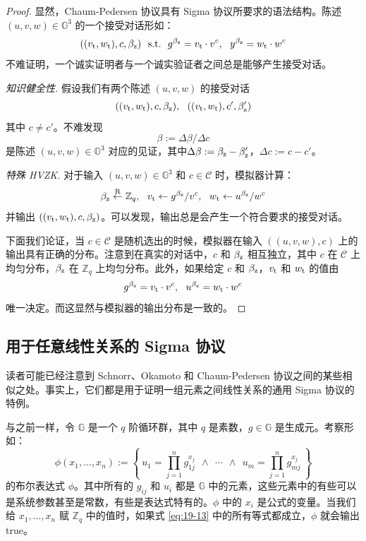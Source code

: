 \begin{proof}
显然，Chaum-Pedersen 协议具有 Sigma 协议所要求的语法结构。陈述 $(u,v,w)\in\mathbb{G}^3$ 的一个接受对话形如：
$$
((v_{\rm t},w_{\rm t}),c,\beta_{\rm z}) \text{~~s.t.~~} 
g^{\beta_{\rm z}}=v_{\rm t}\cdot v^c,~~
y^{\beta_{\rm z}}=w_{\rm t}\cdot w^c
$$
不难证明，一个诚实证明者与一个诚实验证者之间总是能够产生接受对话。

\noindent
\emph{知识健全性.}
假设我们有两个陈述 $(u,v,w)$ 的接受对话
$$
((v_{\rm t},w_{\rm t}),c,\beta_{\rm z}),~~
((v_{\rm t},w_{\rm t}),c',\beta_{\rm z}')
$$
其中 $c\neq c'$。不难发现
$$
\beta:={\Delta\beta}/{\Delta c}
$$
是陈述 $(u,v,w)\in\mathbb{G}^3$ 对应的见证，其中$\Delta\beta:=\beta_{\rm z}-\beta_{\rm z}'$，$\Delta c:=c-c'$。

\vspace{5pt}

\noindent
\emph{特殊 HVZK.}
对于输入 $(u,v,w)\in\mathbb{G}^3$ 和 $c\in\mathcal{C}$ 时，模拟器计算：
$$
\beta_{\rm z}\overset{\rm R}\leftarrow\mathbb{Z}_q,~~
v_{\rm t}\leftarrow{g^{\beta_{\rm z}}}/{v^c},~~
w_{\rm t}\leftarrow{u^{\beta_{\rm z}}}/{w^c}
$$
并输出 $((v_{\rm t},w_{\rm t}),c,\beta_{\rm z})$。可以发现，输出总是会产生一个符合要求的接受对话。

下面我们论证，当 $c\in\mathcal{C}$ 是随机选出的时候，模拟器在输入 $((u,v,w),c)$ 上的输出具有正确的分布。注意到在真实的对话中，$c$ 和 $\beta_{\rm z}$ 相互独立，其中 $c$ 在 $\mathcal{C}$ 上均匀分布，$\beta_{\rm z}$ 在 $\mathbb{Z}_q$ 上均匀分布。此外，如果给定 $c$ 和 $\beta_{\rm z}$，$v_{\rm t}$ 和 $w_{\rm t}$ 的值由
$$
g^{\beta_{\rm z}}=v_{\rm t}\cdot v^c, ~~
u^{\beta_{\rm z}} =w_{\rm t}\cdot w^c
$$
唯一决定。而这显然与模拟器的输出分布是一致的。
\end{proof}

\subsection{用于任意线性关系的 Sigma 协议}\label{subsec:19-5-3}

读者可能已经注意到 Schnorr、Okamoto 和 Chaum-Pedersen 协议之间的某些相似之处。事实上，它们都是用于证明一组元素之间线性关系的通用 Sigma 协议的特例。

与之前一样，令 $\mathbb{G}$ 是一个 $q$ 阶循环群，其中 $q$ 是素数，$g\in\mathbb{G}$ 是生成元。考察形如：
\begin{equation}\label{eq:19-13}
\phi(x_1,\dots,x_n):=
\left\{
~u_1=\prod^n_{j=1}g_{1j}^{x_j} ~~\land~~\cdots~~\land~~ u_m=\prod^n_{j=1}g_{mj}^{x_j}~
\right\}
\end{equation}
的布尔表达式 $\phi$。其中所有的 $g_{ij}$ 和 $u_i$ 都是 $\mathbb{G}$ 中的元素，这些元素中的有些可以是系统参数甚至是常数，有些是表达式特有的。$\phi$ 中的 $x_i$ 是公式的变量。当我们给 $x_1,\dots,x_n$ 赋 $\mathbb{Z}_q$ 中的值时，如果式 \ref{eq:19-13} 中的所有等式都成立，$\phi$ 就会输出 true。

